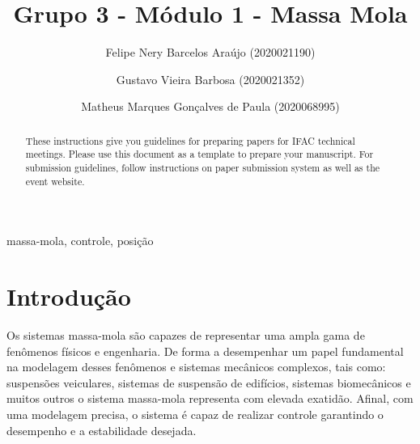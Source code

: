 \documentclass{ifacconf}
\begin{document}
\begin{frontmatter}

\title{Grupo 3 - Módulo 1 - Massa Mola} 


\author[First]{Felipe Nery Barcelos Araújo (2020021190)} 
\author[First]{Gustavo Vieira Barbosa (2020021352)} 
\author[First]{Matheus Marques Gonçalves de Paula (2020068995)}

\address[First]{
  Engenharia de Controle e Automação,\\ Universidade Federal de Minas Gerais, MG \\
   (e-mails: felipenery@ufmg.br, gustavovbarbosa@ufmg.br, mmgp@ufmg.br)
}

\begin{abstract}               
These instructions give you guidelines for preparing papers for IFAC
technical meetings. Please use this document as a template to prepare
your manuscript. For submission guidelines, follow instructions on
paper submission system as well as the event website.
\end{abstract}

\begin{keyword}
massa-mola, controle, posição
\end{keyword}

\end{frontmatter}


\section{Introdução}

Os sistemas massa-mola são capazes de representar uma ampla gama de fenômenos
físicos e engenharia. De forma a desempenhar um papel fundamental na modelagem 
desses fenômenos e sistemas mecânicos complexos, tais como: suspensões veiculares, 
sistemas de suspensão de edifícios, sistemas biomecânicos e muitos outros o sistema 
massa-mola representa com elevada exatidão. Afinal, com uma modelagem precisa, o sistema
é capaz de realizar controle garantindo o desempenho e a estabilidade desejada.
\end{document}
